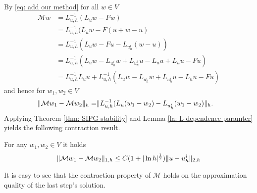 By \eqref{eq: add our method} for all $w \in V$
\begin{align}
	\mathcal M w &= L_{u,h}^{-1}(L_u w - Fw) \nonumber\\
				 &= L_{u,h}^{-1}(L_u w - F(u+w-u) \nonumber\\
				 &= L_{u,h}^{-1}(L_u w - Fu - L_{u^i_h} (w-u)) \nonumber\\
				 &=  L_{u,h}^{-1}(L_u w - L_{u^i_h} w + L_{u^i_h}u - L_u u + L_u u - Fu) \nonumber\\
				 & = L_{u,h}^{-1} L_u u + L_{u,h}^{-1}(L_u w - L_{u^i_h} w + L_{u^i_h}u - L_u u - Fu) \label{eq: expand M}
 \end{align}
and hence for $w_1, w_2 \in V$
\begin{align*}
	\lVert \mathcal M w_1 - \mathcal M w_2 \rVert_{h} =& \lVert L_{u,h}^{-1}(L_u (w_1-w_2) - L_{u^i_h} (w_1-w_2) \rVert_{h}.
\end{align*}
Applying Theorem \ref{thm: SIPG stability} and Lemma \ref{la: L dependence paramter} yields the following contraction result.
\begin{lemma} \label{la: contraction property M}
	For any $w_1, w_2 \in V$ it holds
\begin{align*}
	\lVert \mathcal M w_1 - \mathcal M w_2 \rVert_{1,h}	\leq C (1+|\ln h|^{\frac 1 2})\lVert u - u^i_h \rVert_{2,h} \label{eq: estimate M}
\end{align*}
\end{lemma}
It is easy to see that the contraction property of $\mathcal{M}$ holds on the approximation quality of the last step's solution. %

